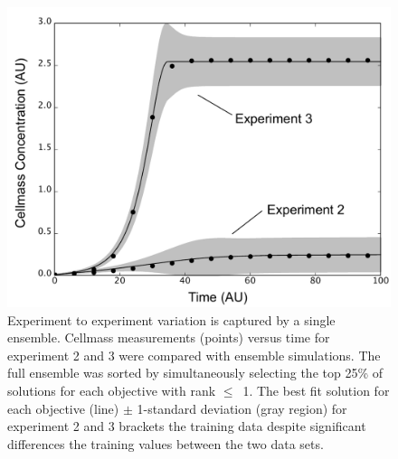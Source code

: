 \documentclass[12pt]{article}
\begin{document}
\begin{figure}[h]
  \includegraphics[width=1.0\textwidth]{./figs/Figure-5-ExperimentToExperimentVariation.pdf}
  \caption{Experiment to experiment variation is captured by a single ensemble.
  Cellmass measurements (points) versus time for experiment 2 and 3 were compared with ensemble simulations.
  The full ensemble was sorted by simultaneously selecting the top 25\% of solutions for each objective with rank $\leq$~1.
  The best fit solution for each objective (line) $\pm$ 1-standard deviation (gray region) for experiment 2 and 3 brackets the training data despite significant differences the training values between the two data sets.}\label{fig:fig-experiment-variation}
\end{figure}

\clearpage

\renewcommand\thefigure{S\arabic{figure}}
\renewcommand\thetable{T\arabic{table}}
\renewcommand\thepage{S-\arabic{page}}
\renewcommand\theequation{S\arabic{equation}}

\setcounter{equation}{0}
\setcounter{table}{0}
\setcounter{figure}{0}
\setcounter{page}{1}
\end{document}
